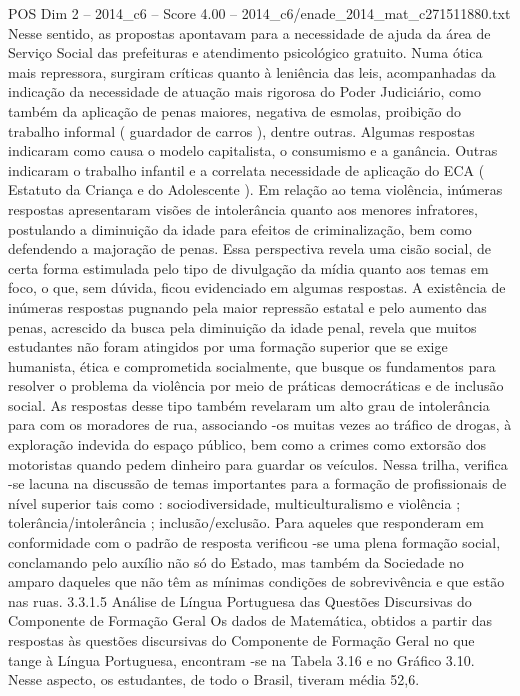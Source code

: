 \begin{textsample}{POS Dim 2 – 2014\_c6 – Score 4.00 – 2014\_c6/enade\_2014\_mat\_c271511880.txt}
Nesse sentido, as propostas apontavam para a necessidade de ajuda da área de Serviço Social das prefeituras e atendimento psicológico gratuito.
Numa ótica mais repressora, surgiram críticas quanto à leniência das leis, acompanhadas da indicação da necessidade de atuação mais rigorosa do Poder Judiciário, como também da aplicação de penas maiores, negativa de esmolas, proibição do trabalho informal ( guardador de carros ), dentre outras.
Algumas respostas indicaram como causa o modelo capitalista, o consumismo e a ganância.
Outras indicaram o trabalho infantil e a correlata necessidade de aplicação do ECA ( Estatuto da Criança e do Adolescente ).
Em relação ao tema violência, inúmeras respostas apresentaram visões de intolerância quanto aos menores infratores, postulando a diminuição da idade para efeitos de criminalização, bem como defendendo a majoração de penas.
Essa perspectiva revela uma cisão social, de certa forma estimulada pelo tipo de divulgação da mídia quanto aos temas em foco, o que, sem dúvida, ficou evidenciado em algumas respostas.
A existência de inúmeras respostas pugnando pela maior repressão estatal e pelo aumento das penas, acrescido da busca pela diminuição da idade penal, revela que muitos estudantes não foram atingidos por uma formação superior que se exige humanista, ética e comprometida socialmente, que busque os fundamentos para resolver o problema da violência por meio de práticas democráticas e de inclusão social.
As respostas desse tipo também revelaram um alto grau de intolerância para com os moradores de rua, associando -os muitas vezes ao tráfico de drogas, à exploração indevida do espaço público, bem como a crimes como extorsão dos motoristas quando pedem dinheiro para guardar os veículos.
Nessa trilha, verifica -se lacuna na discussão de temas importantes para a formação de profissionais de nível superior tais como : sociodiversidade, multiculturalismo e violência ; tolerância/intolerância ; inclusão/exclusão.
Para aqueles que responderam em conformidade com o padrão de resposta verificou -se uma plena formação social, conclamando pelo auxílio não só do Estado, mas também da Sociedade no amparo daqueles que não têm as mínimas condições de sobrevivência e que estão nas ruas. 3.3.1.5 Análise de Língua Portuguesa das Questões Discursivas do Componente de Formação Geral Os dados de Matemática, obtidos a partir das respostas às questões discursivas do Componente de Formação Geral no que tange à Língua Portuguesa, encontram -se na Tabela 3.16 e no Gráfico 3.10.
Nesse aspecto, os estudantes, de todo o Brasil, tiveram média 52,6.

\end{textsample}
